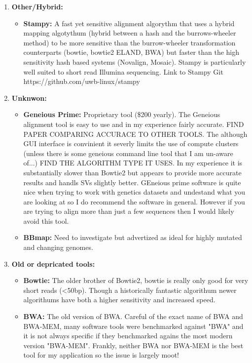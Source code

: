 \documentclass{article}
\begin{document}
\begin{enumerate}
\begin{itemize}
        \end{itemize}


        \item\textbf{Other/Hybrid:}
        \begin{itemize}
            \item \textbf{Stampy:}  A fast yet sensitive alignment algorythm that uses a hybrid mapping algotythum (hybrid between a hash and the burrows-wheeler method) to be more sensitive than the burrow-wheeler transformation counterparts (bowtie, bowtie2 ELAND, BWA) but faster than the high sensitivity hash based systems (Novalign, Mosaic).  Stampy is particularly well suited to short read Illumina sequencing. Link to Stampy Git https://github.com/uwb-linux/stampy\cite{lunterStampyStatisticalAlgorithm2011} 
        \end{itemize}

        \item\textbf{Unknwon:}
        \begin{itemize}
            \item \textbf{Geneious Prime:} Proprietary tool (\$200 yearly). The Geneious alignment tool is easy to use and in my experience fairly accurate.  FIND PAPER COMPARING ACCURACE TO OTHER TOOLS. The although GUI interface is convinient it severly limits the use of compute clusters (unless there is some geneious command line tool that I am un-aware of...) FIND THE ALGORITHM TYPE IT USES.   In my experience it is substantially slower than Bowtie2 but appears to provide more accurate results and handls SVs slightly better.   GEneious prime software is quite nice when trying to work with genetics datasets and undestand what you are looking at so I do recommend the software in general.  However if you are trying to align more than just a few sequences then I would likely avoid this tool.
            \item \textbf{BBmap:}  Need to investigate but advertized as ideal for highly mutated and changing genomes.
        \end{itemize}
            
        \item \textbf{Old or depricated tools:}
        \begin{itemize}
            \item \textbf{Bowtie:} The older brother of Bowtie2, bowtie is really only good for very short reads (<50bp).  Though a historically fantastic algorithum newer algorithums have both a higher sensitivity and increased speed.
            \item \textbf{BWA:} The old version of BWA.  Careful of the exact name of BWA and BWA-MEM, many software tools were benchmarked against "BWA" and it is not always specific if they benchmarked agains the most modern version "BWA-MEM".  Frankly, neither BWA nor BWA-MEM is the best tool for my application so the issue is largely moot!
        \end{itemize}

    \end{enumerate}
        
\end{document}
